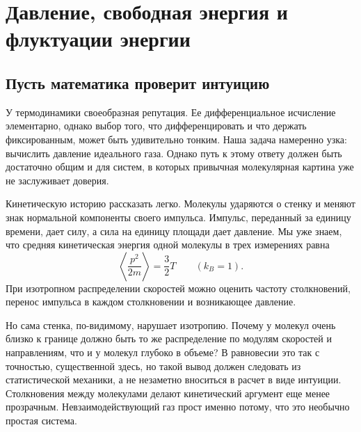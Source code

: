 \chapter{Давление, свободная энергия и флуктуации энергии}


\section{Пусть математика проверит интуицию}

У термодинамики своеобразная репутация. Ее дифференциальное исчисление элементарно, однако выбор того, что дифференцировать и что держать фиксированным, может быть удивительно тонким. Наша задача намеренно узка: вычислить давление идеального газа. Однако путь к этому ответу должен быть достаточно общим и для систем, в которых привычная молекулярная картина уже не заслуживает доверия.

Кинетическую историю рассказать легко. Молекулы ударяются о стенку и меняют знак нормальной компоненты своего импульса. Импульс, переданный за единицу времени, дает силу, а сила на единицу площади дает давление. Мы уже знаем, что средняя кинетическая энергия одной молекулы в трех измерениях равна
\begin{equation}
 \left\langle \frac{p^2}{2m}\right\rangle=\frac{3}{2}T
 \qquad (k_B=1).
 \label{eq:sm5-mean-kinetic-energy}
\end{equation}
При изотропном распределении скоростей можно оценить частоту столкновений, перенос импульса в каждом столкновении и возникающее давление.

Но сама стенка, по-видимому, нарушает изотропию. Почему у молекул очень близко к границе должно быть то же распределение по модулям скоростей и направлениям, что и у молекул глубоко в объеме? В равновесии это так с точностью, существенной здесь, но такой вывод должен следовать из статистической механики, а не незаметно вноситься в расчет в виде интуиции. Столкновения между молекулами делают кинетический аргумент еще менее прозрачным. Невзаимодействующий газ прост именно потому, что это необычно простая система.

